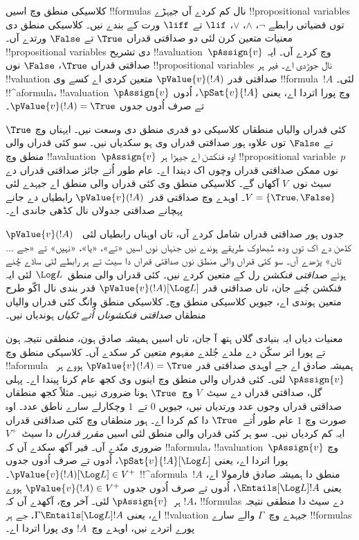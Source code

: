 \documentclass[../../../include/open-logic-section]{subfiles}
\begin{document}


کلاسیکی منطق وچ اسیں !!{formula}s نال کم کردے آں جیہڑے
!!{propositional variable}s توں قضیاتی رابطے $\lnot$، $\land$،
$\lor$، $\lif$ تے $\liff$ ورت کے بندے نیں۔ کلاسیکی منطق دی
معنیات متعین کرن لئی دو صداقتی قدراں $\True$ تے $\False$
ورتدے آں۔ !!{propositional variable}s دی تشریح !!a{valuation}~$\pAssign{v}$
وچ کردے آں۔ ایہ صداقتی قدراں $\True$، $\False$ نوں
!!{propositional variable}s نال جوڑدی اے۔ فیر ہر
!!{valuation} صداقتی قدر $\pValue{v}(!A)$ متعین کردی اے
کسے وی !!{formula}~$!A$ لئی۔ !!^a{formula}،
!!a{valuation}~$\pAssign{v}$ وچ پورا اتردا اے، یعنی $\pSat{v}{!A}$،
اُدوں تے صرف اُدوں جدوں $\pValue{v}(!A) =
\True$۔

کئی قدراں والیاں منطقاں کلاسیکی دو قدری منطق دی وسعت نیں۔
ایہناں وچ $\True$ تے $\False$ توں علاوہ ہور صداقتی قدراں وی
ہو سکدیاں نیں۔ سو کئی قدراں والی منطق وچ !!a{valuation}~$\pAssign{v}$
اوہ فنکشن اے جیہڑا ہر !!{propositional variable}~$p$ نوں ممکن
صداقتی قدراں وچوں اک دیندا اے۔ عام طور اُتے جائز صداقتی
قدراں دے سیٹ نوں~$V$ آکھاں گے۔ کلاسیکی منطق وی کئی قدراں
والی منطق اے جیہدے لئی $V =
\{\True, \False\}$۔ اوہدے وچ صداقتی قدر~$\pValue{v}(!A)$
رابطیاں دے جانے پہچانے صداقتی جدولاں نال کڈھی جاندی اے۔

جدوں ہور صداقتی قدراں شامل کردے آں، تاں اوہناں رابطیاں لئی
~$\pValue{v}(!A)$ کڈھن دے اک توں ودھ سُبھاوک طریقے ہوندے
نیں جنہاں نوں اسیں «تے»، «یا»، «نہیں» تے «جے ... تاں»
پڑھدے آں۔ سو کئی قدراں والی منطق نوں صداقتی قدراں دا سیٹ
تے ہر رابطے لئی ساڈے چُنے ہوئے \emph{صداقتی فنکشن} رل کے
متعین کردے نیں۔ کئی قدراں والی منطق~$\Log L$ لئی ایہ
فنکشن چُنے جان، تاں صداقتی قدر $\pValue{v}(!A)[\Log L]$
قدر بندی نال اکّو طرح متعین ہوندی اے، جیویں کلاسیکی منطق
وچ۔ کلاسیکی منطق وانگ کئی قدراں والیاں منطقاں
\emph{صداقتی فنکشوناں اُتے ٹکیاں} ہوندیاں نیں۔

معنیات دیاں ایہ بنیادی گلاں ہتھ آ جان، تاں اسیں ہمیشہ صادق
ہون، منطقی نتیجہ ہون تے پورا اتر سکّن دے ملدے جُلدے مفہوم
متعین کر سکدے آں۔ کلاسیکی منطق وچ !!a{formula} ہمیشہ صادق
اے جے اوہدی صداقتی قدر $\pValue{v}(!A) = \True$ ہووے ہر~$\pAssign{v}$
لئی۔ کئی قدراں والی منطق وچ اینوں وی کجھ عام کرنا پیندا اے۔
پہلی گل، صداقتی قدراں دے سیٹ~$V$ وچ~$\True$ ہونا ضروری نہیں۔
مثلاً کجھ منطقاں صداقتی قدراں وجوں عدد ورتدیاں نیں، جیویں
$0$ تے~$1$ وچکارلے سارے ناطق عدد۔ اوہ صورت وچ $1$ عام طور
اُتے~$\True$ دا کم کردا اے۔ ہور منطقاں وچ کئی صداقتی قدراں ایہ
کم کردیاں نیں۔ سو ہر کئی قدراں والی منطق لئی اسیں
\emph{مقرر قدراں} دا سیٹ~$V^+$ ضروری منّدے آں۔ فیر آکھ سکدے آں کہ
!!a{formula}، !!a{valuation}~$\pAssign{v}$ وچ پورا اتردا اے،
یعنی $\pSat{v}{!A}[\Log L]$، اُدوں تے صرف اُدوں جدوں
$\pValue{v}(!A)[\Log L] \in V^+$۔ !!^a{formula}~$!A$ منطق
دا ہمیشہ صادق فارمولا اے، یعنی $\Entails[\Log L] !A$،
اُدوں تے صرف اُدوں جدوں $\pValue{v}(!A) \in V^+$ ہووے ہر~$\pAssign{v}$
لئی۔ آخر وچ، آکھدے آں کہ $!A$، !!{formula}s دے سیٹ دا
منطقی نتیجہ اے، یعنی $\Gamma \Entails[\Log L] !A$، جے ہر
!!{valuation} جیہدے وچ~$\Gamma$ والے سارے !!{formula}s پورے
اتردے نیں، اوہدے وچ~$!A$ وی پورا اتردا اے۔
\end{document}
